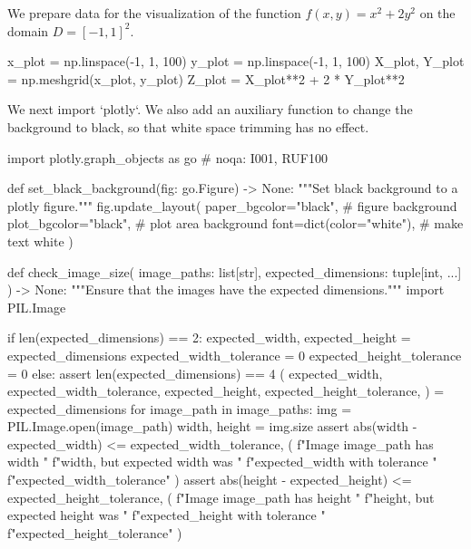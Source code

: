 \documentclass[oneside]{book}
\begin{document}
\begin{mdcell}
We prepare data for the visualization of the function $f(x, y) = x^2 + 2 y^2$ on the domain $D = [-1, 1]^2$.
\end{mdcell}

\begin{pycell}
x_plot = np.linspace(-1, 1, 100)
y_plot = np.linspace(-1, 1, 100)
X_plot, Y_plot = np.meshgrid(x_plot, y_plot)
Z_plot = X_plot**2 + 2 * Y_plot**2
\end{pycell}

\begin{mdcell}
We next import `plotly`. We also add an auxiliary function to change the background to black, so that white space trimming has no effect.
\end{mdcell}

\begin{pycell}
import plotly.graph_objects as go  # noqa: I001, RUF100
\end{pycell}

\begin{pycell}
def set_black_background(fig: go.Figure) -> None:
    """Set black background to a plotly figure."""
    fig.update_layout(
        paper_bgcolor="black",  # figure background
        plot_bgcolor="black",  # plot area background
        font=dict(color="white"),  # make text white
    )
\end{pycell}

\begin{pycell}
def check_image_size(
    image_paths: list[str], expected_dimensions: tuple[int, ...]
) -> None:
    """Ensure that the images have the expected dimensions."""
    import PIL.Image

    if len(expected_dimensions) == 2:
        expected_width, expected_height = expected_dimensions
        expected_width_tolerance = 0
        expected_height_tolerance = 0
    else:
        assert len(expected_dimensions) == 4
        (
            expected_width,
            expected_width_tolerance,
            expected_height,
            expected_height_tolerance,
        ) = expected_dimensions
    for image_path in image_paths:
        img = PIL.Image.open(image_path)
        width, height = img.size
        assert abs(width - expected_width) <= expected_width_tolerance, (
            f"Image {image_path} has width "
            f"{width}, but expected width was "
            f"{expected_width} with tolerance "
            f"{expected_width_tolerance}"
        )
        assert abs(height - expected_height) <= expected_height_tolerance, (
            f"Image {image_path} has height "
            f"{height}, but expected height was "
            f"{expected_height} with tolerance "
            f"{expected_height_tolerance}"
        )
\end{pycell}
\end{document}
